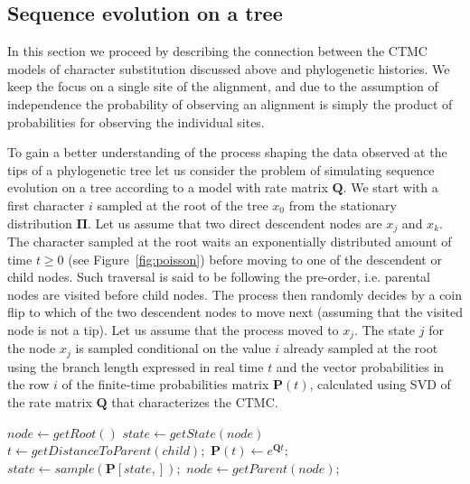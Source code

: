 \subsection{Sequence evolution on a tree\label{sub:evolutionOnTree}}

In this section we proceed by describing the connection between the CTMC models of character substitution discussed above and phylogenetic histories.
We keep the focus on a single site of the alignment, and due to the assumption of independence the probability of observing an alignment is simply the product of probabilities for observing the individual sites.

To gain a better understanding of the process shaping the data observed at the tips of a phylogenetic tree let us consider the problem of simulating sequence evolution on a tree according to a model with rate matrix $\mathbf{Q}$.
We start with a first character $i$ sampled at the root of the tree $x_0$ from the stationary distribution $\mathbf{\Pi}$.
Let us assume that two direct descendent nodes are $x_j$ and $x_k$.
The character sampled at the root waits an exponentially distributed amount of time $t\geq0$ (see Figure~\ref{fig:poisson}) before moving to one of the descendent or child nodes.
Such traversal is said to be following the pre-order, i.e. parental nodes are visited before child nodes.   
The process then randomly decides by a coin flip to which of the two descendent nodes to move next (assuming that the visited node is not a tip).
Let us assume that the process moved to $x_j$.
The state $j$ for the node $x_j$ is sampled conditional on the value $i$ already sampled at the root using the branch length expressed in real time $t$ and the vector probabilities in the row $i$ of the finite-time probabilities matrix $\mathbf{P}(t)$, calculated using SVD of the rate matrix $\mathbf{Q}$ that characterizes the CTMC.   

\begin{algorithm}[h!]
\centering
\begin{algorithmic}[1]
%
\State $node \gets getRoot\left(\right)$
%
\State $state \gets getState\left(node\right)$
%
\Repeat
%
%
%
\State $t \gets getDistanceToParent\left(child\right);$
%
\State $ \mathbf{P}\left(t\right) \gets e^{\mathbf{Q}t};$
%
\State $state \gets sample\left(\mathbf{P}\left[ state, \right]\right);$
%
\EndFor
%
\Else {}
%
\State $node \gets getParent\left(node\right);$
%
\EndIf
%
\end{algorithmic}
\caption{
{ \footnotesize 
{\bf Pseudo code for simulating an evolutionary process along a phylogeny.} 
When a child node is visited, the state is sampled with conditional probabilities of changing to state $j$ given state $i$ at the parental node.
}%
}
\label{alg:simulation}
\end{algorithm}

